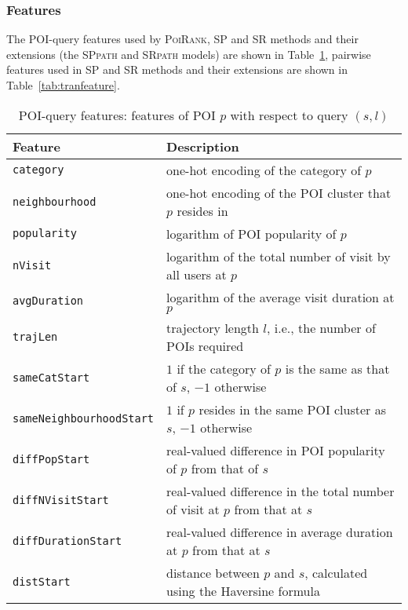 \subsubsection{Features}
The POI-query features used by \textsc{PoiRank}, SP and SR methods and their extensions 
(\ie the \textsc{SPpath} and \textsc{SRpath} models) are shown in Table~\ref{tab:poifeature},
pairwise features used in SP and SR methods and their extensions are shown in Table~\ref{tab:tranfeature}.

\begin{table}[!h]
\small
\setlength{\tabcolsep}{10pt} %
\begin{tabular}{l|l} \hline
\textbf{Feature}       & \textbf{Description} \\ \hline
\texttt{category}      & one-hot encoding of the category of $p$ \\
\texttt{neighbourhood} & one-hot encoding of the POI cluster that $p$ resides in \\
\texttt{popularity}    & logarithm of POI popularity of $p$ \\
\texttt{nVisit}        & logarithm of the total number of visit by all users at $p$ \\
\texttt{avgDuration}  & logarithm of the average visit duration at $p$ \\
\hline

\texttt{trajLen}           & trajectory length $l$, i.e., the number of POIs required \\
\texttt{sameCatStart}      & $1$ if the category of $p$ is the same as that of $s$, $-1$ otherwise \\
\texttt{sameNeighbourhoodStart} & $1$ if $p$ resides in the same POI cluster as $s$, $-1$ otherwise \\
\texttt{diffPopStart}    & real-valued difference in POI popularity of $p$ from that of $s$ \\
\texttt{diffNVisitStart}        & real-valued difference in the total number of visit at $p$ from that at $s$ \\
\texttt{diffDurationStart}  & real-valued difference in average duration at $p$ from that at $s$ \\
\texttt{distStart}          & distance between $p$ and $s$, calculated using the Haversine formula \\
\hline
\end{tabular}
\caption{POI-query features: features of POI $p$ with respect to query $(s,l)$}
\label{tab:poifeature}
\centering
\end{table}



